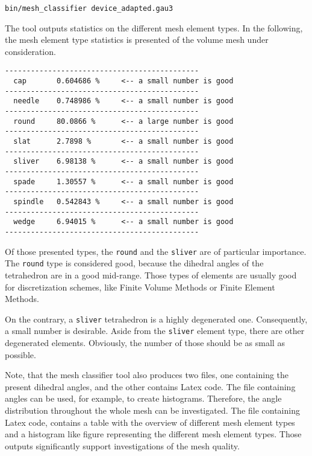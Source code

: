 \begin{exaipd}
\begin{Verbatim}
bin/mesh_classifier device_adapted.gau3
\end{Verbatim}
\end{exaipd}

The tool outputs statistics on the different mesh element types. 
In the following, the mesh element type statistics is presented of 
the volume mesh under consideration.

\begin{exaipd}
\begin{Verbatim}
---------------------------------------------
  cap       0.604686 %     <-- a small number is good
---------------------------------------------
  needle    0.748986 %     <-- a small number is good
---------------------------------------------
  round     80.0866 %      <-- a large number is good
---------------------------------------------
  slat      2.7898 %       <-- a small number is good
---------------------------------------------
  sliver    6.98138 %      <-- a small number is good
---------------------------------------------
  spade     1.30557 %      <-- a small number is good
---------------------------------------------
  spindle   0.542843 %     <-- a small number is good
---------------------------------------------
  wedge     6.94015 %      <-- a small number is good
---------------------------------------------
\end{Verbatim}
\end{exaipd}

Of those presented types, the \texttt{round} and the \texttt{sliver} 
are of particular importance. The \texttt{round} type is considered good, 
because the dihedral angles of the tetrahedron are in a good mid-range. 
Those types of elements are usually good for discretization schemes, like 
Finite Volume Methods or Finite Element Methods. 

On the contrary, a \texttt{sliver} tetrahedron is a highly degenerated one. 
Consequently, a small number is desirable. Aside from the \texttt{sliver}
element type, there are other degenerated elements. Obviously, the number of 
those should be as small as possible. 

Note, that the mesh classifier tool also produces two files, one containing 
the present dihedral angles, and the other contains Latex code. 
The file containing angles can be used, for example, to create histograms.
Therefore, the angle distribution throughout the whole mesh can be investigated.
The file containing Latex code, contains a table with the overview of different 
mesh element types and a histogram like figure representing the different mesh 
element types. 
Those outputs significantly support investigations of the mesh quality.

